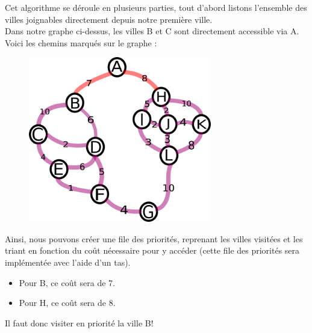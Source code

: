 \documentclass[a4paper, 12pt]{article}
\numberwithin{equation}{subsection}
\begin{document}
Cet algorithme se déroule en plusieurs parties, tout d'abord listons l'ensemble des villes joignables directement depuis notre première ville. \\

Dans notre graphe ci-dessus, les villes B et C sont directement accessible via A.\\

Voici les chemins marqués sur le graphe : \\
\begin{figure}[H]
  \centering
  \includegraphics[width=8.0cm]{imgs/second_search.png}
\end{figure}
Ainsi, nous pouvons créer une file des priorités, reprenant les villes visitées et les triant en fonction du coût nécessaire pour y accéder (cette file des priorités sera implémentée avec l'aide d'un tas). \\
\begin{itemize}
  \item Pour B, ce coût sera de 7.
  \item Pour H, ce coût sera de 8.
\end{itemize}
Il faut donc visiter en priorité la ville B! \\
\end{document}

